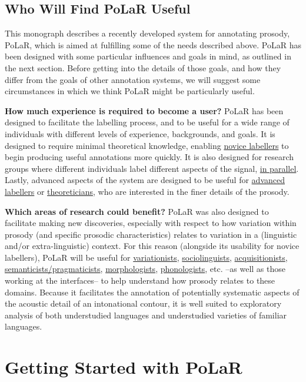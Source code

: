 \documentclass[11pt, twoside]{memoir}
\begin{document}
\section{Who Will Find PoLaR Useful}\label{sec:who-will-find-polar-useful}

This monograph describes a recently developed system for annotating prosody, PoLaR, which is  aimed at fulfilling some of the needs described above. PoLaR has been designed with some particular influences and goals in mind, as outlined in the next section. Before getting into the details of those goals, and how they differ from the goals of other annotation systems, we will suggest some circumstances in which we think PoLaR might be particularly useful.

\textbf{How much experience is required to become a user?} PoLaR has been designed to facilitate the labelling process, and to be useful for a wide range of individuals with different levels of experience, backgrounds, and goals. It is designed to require minimal theoretical knowledge, enabling \uline{novice labellers} to begin producing useful annotations more quickly. It is also designed for research groups where different individuals label different aspects of the signal, \uline{in parallel}. Lastly, advanced aspects of the system are designed to be useful for \uline{advanced labellers} or \uline{theoreticians}, who are interested in the finer details of the prosody.

\textbf{Which areas of research could benefit?} PoLaR was also designed to facilitate making new discoveries, especially with respect to how variation within prosody (and specific prosodic characteristics) relates to variation in a (linguistic and/or extra-linguistic) context. For this reason (alongside its usability for novice labellers), PoLaR will be useful for \uline{variationists}, \uline{sociolinguists}, \uline{acquisitionists}, \uline{semanticists\slash pragmaticists}, \uline{morphologists}, \uline{phonologists}, etc. --as well as those working at the interfaces-- to help understand how prosody relates to these domains. Because it facilitates the annotation of potentially systematic aspects of the acoustic detail of an intonational contour, it is well suited to exploratory analysis of both understudied languages and understudied varieties of familiar languages.





\chapter{Getting Started with PoLaR}\label{ch:basics}
\end{document}
